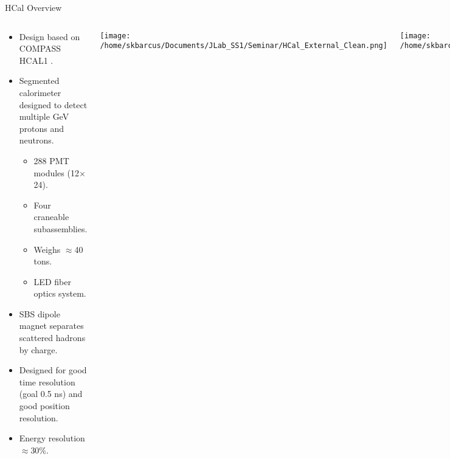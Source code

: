 \documentclass[10pt]{beamer}
\begin{document}
\begin{frame}{HCal Overview}

	\vspace{-3mm}
    \begin{columns}[T,onlytextwidth]
  	
  	\begin{center}
  	
	\begin{itemize}
		\item Design based on COMPASS HCAL1 \parencite{hcal1}.
		\item Segmented calorimeter designed to detect multiple GeV protons and neutrons.
		\begin{itemize}\itemsep0pt \parskip0pt 
			\item[--] 288 PMT modules (12$\times$24).
			\item[--] Four craneable subassemblies.
			\item[--] Weighs $\approx$40 tons.
			\item[--] LED fiber optics system.
		\end{itemize}
		\item SBS dipole magnet separates scattered hadrons by charge.
		\item Designed for \alert{good time resolution} (goal 0.5 ns) and \alert{good position resolution}.
		\item Energy resolution $\approx$30\%.
	\end{itemize}
	
	\end{center}
	
	  \begin{center}
  		\texttt{[image: /home/skbarcus/Documents/JLab\_SS1/Seminar/HCal\_External\_Clean.png]}
  	\end{center}
	\begin{center}
  		\texttt{[image: /home/skbarcus/JLab/SBS/HCal/Pictures/G4SBS/Proton\_Neutron\_Separation\_Kin3\_Clean.png]}
  	\end{center}
	\end{columns}

\end{frame}
\end{document}
